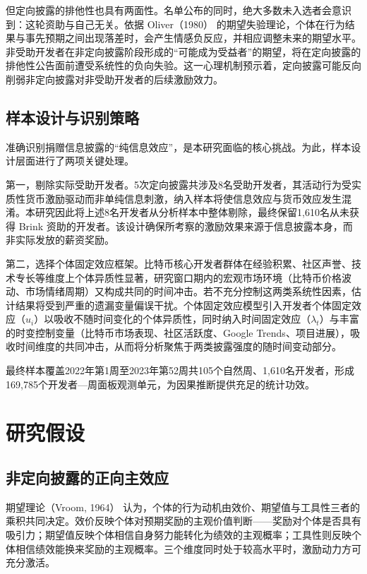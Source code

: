 \documentclass[
    type = master, %
    degree = professional,        %
    decl-page,  %
    twoside,                %
    fontset = fandol %
  ]{njuthesis}
\begin{document}
但定向披露的排他性也具有两面性。名单公布的同时，绝大多数未入选者会意识到：这轮资助与自己无关。依据 Oliver（1980）\cite{oliver1980cognitive} 的期望失验理论，个体在行为结果与事先预期之间出现落差时，会产生情感负反应，并相应调整未来的期望水平。非受助开发者在非定向披露阶段形成的“可能成为受益者”的期望，将在定向披露的排他性公告面前遭受系统性的负向失验。这一心理机制预示着，定向披露可能反向削弱非定向披露对非受助开发者的后续激励效力。

\subsection{样本设计与识别策略}

准确识别捐赠信息披露的“纯信息效应”，是本研究面临的核心挑战。为此，样本设计层面进行了两项关键处理。

第一，剔除实际受助开发者。5次定向披露共涉及8名受助开发者，其活动行为受实质性货币激励驱动而非单纯信息刺激，纳入样本将使信息效应与货币效应发生混淆。本研究因此将上述8名开发者从分析样本中整体剔除，最终保留1,610名从未获得 Brink 资助的开发者。该设计确保所考察的激励效果来源于信息披露本身，而非实际发放的薪资奖励。

第二，选择个体固定效应框架。比特币核心开发者群体在经验积累、社区声誉、技术专长等维度上个体异质性显著，研究窗口期内的宏观市场环境（比特币价格波动、市场情绪周期）又构成共同的时间冲击。若不充分控制这两类系统性因素，估计结果将受到严重的遗漏变量偏误干扰。个体固定效应模型引入开发者个体固定效应（$u_i$）以吸收不随时间变化的个体异质性，同时纳入时间固定效应（$\lambda_t$）与丰富的时变控制变量（比特币市场表现、社区活跃度、Google Trends、项目进展），吸收时间维度的共同冲击，从而将分析聚焦于两类披露强度的随时间变动部分。

最终样本覆盖2022年第1周至2023年第52周共105个自然周、1,610名开发者，形成169,785个开发者—周面板观测单元，为因果推断提供充足的统计功效。

\section{研究假设}
\label{sec:hypotheses-1}

\subsection{非定向披露的正向主效应}

期望理论（Vroom, 1964）\cite{vroom1964work} 认为，个体的行为动机由效价、期望值与工具性三者的乘积共同决定。效价反映个体对预期奖励的主观价值判断——奖励对个体是否具有吸引力；期望值反映个体相信自身努力能转化为绩效的主观概率；工具性则反映个体相信绩效能换来奖励的主观概率。三个维度同时处于较高水平时，激励动力方可充分激活。
\end{document}
